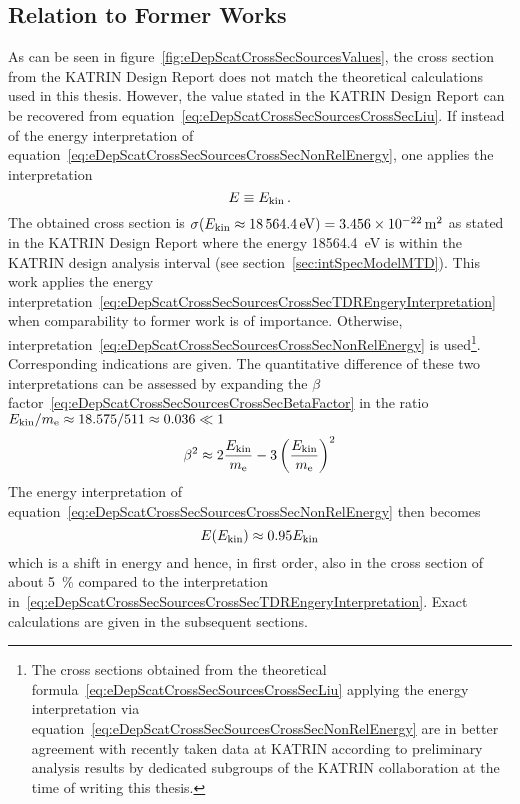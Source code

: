 \subsection{Relation to Former Works}
\label{sec:eDepScatCrossSecSourcesChoice}
As can be seen in figure~\ref{fig:eDepScatCrossSecSourcesValues}, the cross section from the KATRIN Design Report does not match the theoretical calculations used in this thesis. However, the value stated in the KATRIN Design Report can be recovered from equation~\eqref{eq:eDepScatCrossSecSourcesCrossSecLiu}. If instead of the energy interpretation
of equation~\ref{eq:eDepScatCrossSecSourcesCrossSecNonRelEnergy}, one applies the interpretation
\begin{equation}
	\label{eq:eDepScatCrossSecSourcesCrossSecTDREngeryInterpretation}
	E \equiv E_\mathrm{kin}
	\text{\,.}
\end{equation}
The obtained cross section is $\sigma(E_\mathrm{kin} \approx \SI{18564.4}{eV}) = \SI{3.456e-22}{m^2}$ as stated in the KATRIN Design Report where the energy \SI{18564.4}{eV} is within the KATRIN design analysis interval (see section~\ref{sec:intSpecModelMTD}). This work applies the energy interpretation~\eqref{eq:eDepScatCrossSecSourcesCrossSecTDREngeryInterpretation} when comparability to former work is of importance. Otherwise, interpretation~\eqref{eq:eDepScatCrossSecSourcesCrossSecNonRelEnergy} is used\footnote{The cross sections obtained from the theoretical formula~\eqref{eq:eDepScatCrossSecSourcesCrossSecLiu} applying the energy interpretation via equation~\eqref{eq:eDepScatCrossSecSourcesCrossSecNonRelEnergy} are in better agreement with recently taken data at KATRIN according to preliminary analysis results by dedicated subgroups of the KATRIN collaboration at the time of writing this thesis.}. Corresponding indications are given. The quantitative difference of these two interpretations can be assessed by expanding the $\beta$ factor~\eqref{eq:eDepScatCrossSecSourcesCrossSecBetaFactor} in the ratio $E_\mathrm{kin}/m_{\mathrm{e}} \approx 18.575/511 \approx 0.036 \ll 1$
\begin{equation}
	\beta^2 \approx 
	2 \frac{E_\mathrm{kin}}{m_{\mathrm{e}}} - 
	3 \left(\frac{E_\mathrm{kin}}{m_{\mathrm{e}}}\right)^2
\end{equation}
The energy interpretation of equation~\eqref{eq:eDepScatCrossSecSourcesCrossSecNonRelEnergy} then becomes
\begin{equation}
	E(E_\mathrm{kin}) \approx 0.95 E_\mathrm{kin}
\end{equation}
which is a shift in energy and hence, in first order, also in the cross section of about \SI{5}{\percent} compared to the interpretation in~\eqref{eq:eDepScatCrossSecSourcesCrossSecTDREngeryInterpretation}. Exact calculations are given in the subsequent sections.


